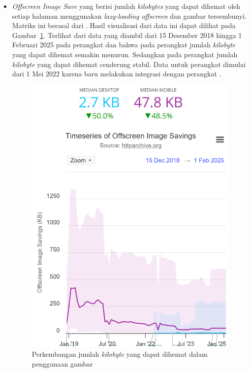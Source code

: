 \begin{itemize}
    \item \textit{Offscreen Image Save} yang berisi jumlah \textit{kilobytes} yang dapat dihemat oleh setiap halaman menggunakan \textit{lazy-loading offscreen} dan gambar tersembunyi. Matriks ini berasal dari \light. Hasil visualisasi dari data ini dapat dilihat pada Gambar~\ref{fig:offscreen}. Terlihat dari data yang diambil dari 15 Desember 2018 hingga 1 Februari 2025 pada perangkat \desktop dan \mobile bahwa pada perangkat \mobile jumlah \textit{kilobyte} yang dapat dihemat semakin menurun. Sedangkan pada perangkat \desktop jumlah \textit{kilobyte} yang dapat dihemat cenderung stabil. Data untuk perangkat \desktop dimulai dari 1 Mei 2022 karena \light baru melakukan integrasi dengan perangkat \desktop.
    \begin{figure}[H]
        \centering
        \includegraphics[width=0.4\linewidth]{Gambar/Contoh Hide Image.png}
        \caption{Perkembangan jumlah \textit{kilobyte} yang dapat dihemat dalam penggunaan gambar}
        \label{fig:offscreen}
    \end{figure}
    


\end{itemize}

